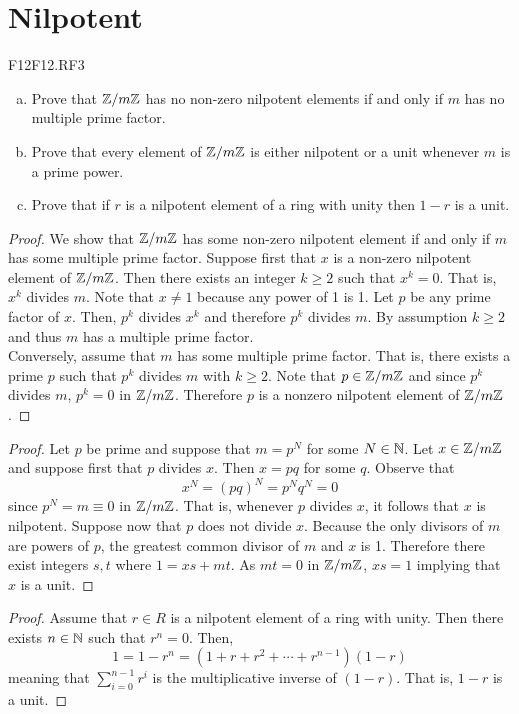 \documentclass[../AlgebraQualSolutions.tex]{subfiles}
\begin{document}
\section{Nilpotent}

\begin{prob}{F12}{F12.RF3}
\begin{enumerate}[(a)]
\item Prove that $\mathbb{Z}/m\mathbb{Z}$ has no non-zero nilpotent elements if and only if $m$ has no multiple prime factor.
\item Prove that every element of $\mathbb{Z}/m\mathbb{Z}$ is either nilpotent or a unit whenever $m$ is a prime power.
\item Prove that if $r$ is a nilpotent element of a ring with unity then $1-r$ is a unit.
\end{enumerate}
\end{prob}

\begin{proof}
    We show that $\mathbb{Z}/m\mathbb{Z}$ has some non-zero nilpotent element if and only if $m$ has some multiple prime factor. Suppose first that $x$ is a non-zero nilpotent element of $\mathbb{Z}/m\mathbb{Z}$. Then there exists an integer $k \geq 2$ such that $x^k = 0$. That is, $x^k$ divides $m$. Note that $x \neq 1$ because any power of 1 is 1. Let $p$ be any prime factor of $x$. Then, $p^k$ divides $x^k$ and therefore $p^k$ divides $m$. By assumption $k \geq 2$ and thus $m$ has a multiple prime factor.\\

    Conversely, assume that $m$ has some multiple prime factor. That is, there exists a prime $p$ such that $p^k$ divides $m$ with $k \geq 2$. Note that $p \in \mathbb{Z}/m\mathbb{Z}$ and since $p^k$ divides $m$, $p^k = 0$ in $\mathbb{Z}/m\mathbb{Z}$. Therefore $p$ is a nonzero nilpotent element of $\mathbb{Z}/m\mathbb{Z}$.
\end{proof}

\begin{proof}
    Let $p$ be prime and suppose that $m = p^N$ for some $N \in \mathbb{N}$. Let $x \in \mathbb{Z}/m\mathbb{Z}$ and suppose first that $p$ divides $x$. Then $x = pq$ for some $q$. Observe that
        \[x^N = (pq)^N = p^Nq^N = 0\]
    since $p^N = m \equiv 0$ in $\mathbb{Z}/m\mathbb{Z}$. That is, whenever $p$ divides $x$, it follows that $x$ is nilpotent. Suppose now that $p$ does not divide $x$. Because the only divisors of $m$ are powers of $p$, the greatest common divisor of $m$ and $x$ is 1. Therefore there exist integers $s,t$ where $1 = xs + mt$. As $mt = 0$ in $\mathbb{Z}/m\mathbb{Z}$, $xs = 1$ implying that $x$ is a unit.
\end{proof}

\begin{proof}
    Assume that $r \in R$ is a nilpotent element of a ring with unity. Then there exists $n \in \mathbb{N}$ such that $r^n = 0$. Then,
        \[1 = 1 - r^n = (1 + r + r^2 + \cdots + r^{n-1})(1-r)\]
    meaning that $\sum_{i=0}^{n-1}r^i$ is the multiplicative inverse of $(1-r)$. That is, $1-r$ is a unit.
\end{proof}
\end{document}
